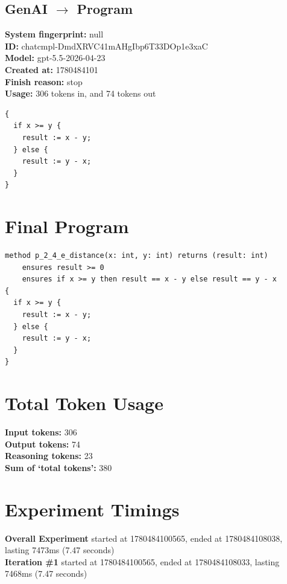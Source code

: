 \documentclass{article}
\begin{document}
\subsection*{GenAI $\rightarrow$ Program}
\textbf{System fingerprint: }null
\\\textbf{ID: }chatcmpl-DmdXRVC41mAHgIbp6T33DOp1e3xaC
\\\textbf{Model: }gpt-5.5-2026-04-23
\\\textbf{Created at: }1780484101
\\\textbf{Finish reason: }stop
\\\textbf{Usage: }306 tokens in, and 74 tokens out
\begin{lstlisting}
{
  if x >= y {
    result := x - y;
  } else {
    result := y - x;
  }
}
\end{lstlisting}
\section*{Final Program}
\begin{lstlisting}
method p_2_4_e_distance(x: int, y: int) returns (result: int)
	ensures result >= 0
	ensures if x >= y then result == x - y else result == y - x
{
  if x >= y {
    result := x - y;
  } else {
    result := y - x;
  }
}
\end{lstlisting}
\section*{Total Token Usage}
\textbf{Input tokens: }306
\\\textbf{Output tokens: }74
\\\textbf{Reasoning tokens: }23
\\\textbf{Sum of `total tokens': }380
\section*{Experiment Timings}
\textbf{Overall Experiment} started at 1780484100565, ended at 1780484108038, lasting 7473ms (7.47 seconds)
\\\textbf{Iteration \#1} started at 1780484100565, ended at 1780484108033, lasting 7468ms (7.47 seconds)
\end{document}
